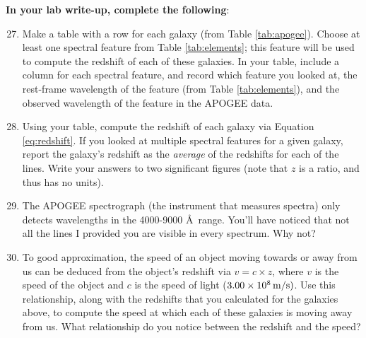 \documentclass[11pt]{article}
\begin{document}
\textbf{In your lab write-up, complete the following}:
\begin{enumerate}
    \setcounter{enumi}{26}
    
    \item Make a table with a row for each galaxy (from Table \ref{tab:apogee}). Choose at least one spectral feature from Table \ref{tab:elements}; this feature will be used to compute the redshift of each of these galaxies. In your table, include a column for each spectral feature, and record which feature you looked at, the rest-frame wavelength of the feature (from Table \ref{tab:elements}), and the observed wavelength of the feature in the APOGEE data. 
    
    \item Using your table, compute the redshift of each galaxy via Equation \ref{eq:redshift}. If you looked at multiple spectral features for a given galaxy, report the galaxy's redshift as the \emph{average} of the redshifts for each of the lines. Write your answers to two significant figures (note that $z$ is a ratio, and thus has no units).
    
    \item The APOGEE spectrograph (the instrument that measures spectra) only detects wavelengths in the 4000-9000 \AA \, range. You'll have noticed that not all the lines I provided you are visible in every spectrum.  Why not?
    
    \item To good approximation, the speed of an object moving towards or away from us can be deduced from the object's redshift via $v = c \times z$, where $v$ is the speed of the object and $c$ is the speed of light ($3.00 \times 10^8 \, {\rm m/s})$. Use this relationship, along with the redshifts that you calculated for the galaxies above, to compute the speed at which each of these galaxies is moving away from us. What relationship do you notice between the redshift and the speed?
\end{enumerate}
\end{document}
